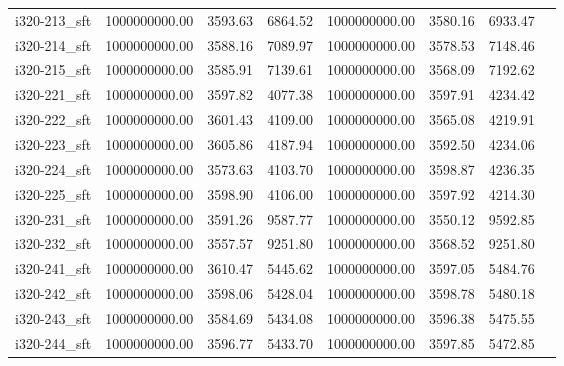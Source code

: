 \begin{tabular}{llrrrrrr}
i320-213\_sft &           1000000000.00 &                     3593.63 &               6864.52 &    1000000000.00 &              3580.16 &        6933.47 \\
i320-214\_sft &           1000000000.00 &                     3588.16 &               7089.97 &    1000000000.00 &              3578.53 &        7148.46 \\
i320-215\_sft &           1000000000.00 &                     3585.91 &               7139.61 &    1000000000.00 &              3568.09 &        7192.62 \\
i320-221\_sft &           1000000000.00 &                     3597.82 &               4077.38 &    1000000000.00 &              3597.91 &        4234.42 \\
i320-222\_sft &           1000000000.00 &                     3601.43 &               4109.00 &    1000000000.00 &              3565.08 &        4219.91 \\
i320-223\_sft &           1000000000.00 &                     3605.86 &               4187.94 &    1000000000.00 &              3592.50 &        4234.06 \\
i320-224\_sft &           1000000000.00 &                     3573.63 &               4103.70 &    1000000000.00 &              3598.87 &        4236.35 \\
i320-225\_sft &           1000000000.00 &                     3598.90 &               4106.00 &    1000000000.00 &              3597.92 &        4214.30 \\
i320-231\_sft &           1000000000.00 &                     3591.26 &               9587.77 &    1000000000.00 &              3550.12 &        9592.85 \\
i320-232\_sft &           1000000000.00 &                     3557.57 &               9251.80 &    1000000000.00 &              3568.52 &        9251.80 \\
i320-241\_sft &           1000000000.00 &                     3610.47 &               5445.62 &    1000000000.00 &              3597.05 &        5484.76 \\
i320-242\_sft &           1000000000.00 &                     3598.06 &               5428.04 &    1000000000.00 &              3598.78 &        5480.18 \\
i320-243\_sft &           1000000000.00 &                     3584.69 &               5434.08 &    1000000000.00 &              3596.38 &        5475.55 \\
i320-244\_sft &           1000000000.00 &                     3596.77 &               5433.70 &    1000000000.00 &              3597.85 &        5472.85 \\

\end{tabular}
